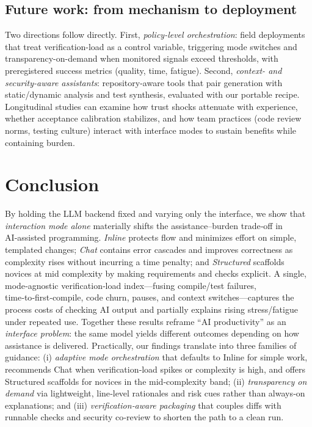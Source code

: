 \documentclass[sigconf]{acmart}
\begin{document}
\subsection{Future work: from mechanism to deployment}
Two directions follow directly. First, \emph{policy-level orchestration}: field deployments that treat verification-load as a control variable, triggering mode switches and transparency-on-demand when monitored signals exceed thresholds, with preregistered success metrics (quality, time, fatigue). Second, \emph{context- and security-aware assistants}: repository-aware tools that pair generation with static/\allowbreak{}dynamic analysis and test synthesis, evaluated with our portable recipe. Longitudinal studies can examine how trust shocks attenuate with experience, whether acceptance calibration stabilizes, and how team practices (code review norms, testing culture) interact with interface modes to sustain benefits while containing burden.

\section{Conclusion}
\label{sec:conclusion}

By holding the LLM backend fixed and varying only the interface, we show that \emph{interaction mode alone} materially shifts the assistance–burden trade‑off in AI‑assisted programming. \emph{Inline} protects flow and minimizes effort on simple, templated changes; \emph{Chat} contains error cascades and improves correctness as complexity rises without incurring a time penalty; and \emph{Structured} scaffolds novices at mid complexity by making requirements and checks explicit. A single, mode‑agnostic verification‑load index—fusing compile/test failures, time‑to‑first‑compile, code churn, pauses, and context switches—captures the process costs of checking AI output and partially explains rising stress/fatigue under repeated use. Together these results reframe “AI productivity” as an \emph{interface problem}: the same model yields different outcomes depending on how assistance is delivered. Practically, our findings translate into three families of guidance: (i) \emph{adaptive mode orchestration} that defaults to Inline for simple work, recommends Chat when verification‑load spikes or complexity is high, and offers Structured scaffolds for novices in the mid‑complexity band; (ii) \emph{transparency on demand} via lightweight, line‑level rationales and risk cues rather than always‑on explanations; and (iii) \emph{verification‑aware packaging} that couples diffs with runnable checks and security co‑review to shorten the path to a clean run.
\end{document}
